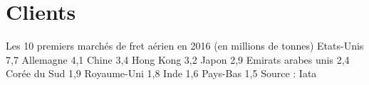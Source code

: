 \section{Clients}


Les 10 premiers marchés de fret aérien en 2016 
(en millions de tonnes)
Etats-Unis  	7,7
Allemagne 	4,1
Chine  	3,4
Hong Kong	3,2
Japon	2,9
Emirats arabes unis 	2,4
Corée du Sud 	1,9
Royaume-Uni 	1,8
Inde  	1,6
Pays-Bas 	1,5
Source : Iata